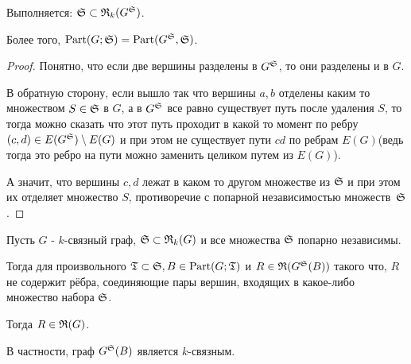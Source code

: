 \begin{customlm}{1.1} \label{lemma:1_1}
	Выполняется: $\S \subset \R_k(G^\S)$.

	Более того, $\Part(G; \S) = \Part(G^\S, \S)$.
\end{customlm}

\begin{proof}
	Понятно, что если две вершины разделены в $G^\S$, то они разделены и в $G$.

	В обратную сторону, если вышло так что вершины $a, b$ отделены каким то множеством $S \in \S$ в  $G$, а в  $G^\S$ все равно существует путь после удаления $S$, то тогда можно сказать что этот путь проходит в какой то момент по ребру  $(c,d) \in E(G^\S) \setminus E(G)$ и при этом не существует пути $cd$ по ребрам $E(G)$(ведь тогда это ребро на пути можно заменить целиком путем из $E(G)$).

	А значит, что вершины $c, d$ лежат в каком то другом множестве из  $\S$ и при этом их отделяет множество  $S$, противоречие с попарной независимостью множеств~$\S$.
\end{proof}

\begin{customlm}{1.2} \label{lemma:1_2}
	Пусть $G$ - $k$-связный граф, $\S \subset \R_k(G)$ и все множества $\S$ попарно независимы.

	Тогда для произвольного $\T \subset \S, B \in \Part(G; \T)$ и $R \in \R(G^\S(B))$ такого что, $R$ не содержит рёбра, соединяющие пары вершин, входящих в какое-либо множество набора $\S$.
	
	Тогда $R \in \R(G)$.

	В частности, граф  $G^\S(B)$ является $k$-связным.
\end{customlm}

